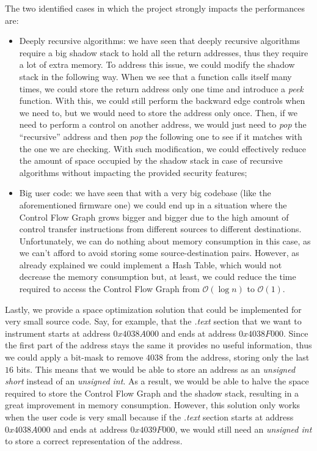 The two identified cases in which the project strongly impacts the performances
are:
\begin{itemize}
  \item Deeply recursive algorithms: we have seen that deeply recursive
    algorithms require a big shadow stack to hold all the return addresses, thus
    they require a lot of extra memory. To address this issue, we could modify the
    shadow stack in the following way. When we see that a function calls itself
    many times, we could store the return address only one time and introduce a \textit{peek}
    function. With this, we could still perform the backward edge controls when
    we need to, but we would need to store the address only once. Then, if we need
    to perform a control on another address, we would just need to \textit{pop} the
    ``recursive'' address and then \textit{pop} the following one to see if it
    matches with the one we are checking. With such modification, we could
    effectively reduce the amount of space occupied by the shadow stack in case
    of recursive algorithms without impacting the provided security features;

  \item Big user code: we have seen that with a very big codebase (like the aforementioned
    firmware one) we could end up in a situation where the Control Flow Graph
    grows bigger and bigger due to the high amount of control transfer
    instructions from different sources to different destinations. Unfortunately,
    we can do nothing about memory consumption in this case, as we can't afford to
    avoid storing some source-destination pairs. However, as already explained we
    could implement a Hash Table, which would not decrease the memory
    consumption but, at least, we could reduce the time required to access the
    Control Flow Graph from $\mathcal{O}(\log{n})$ to $\mathcal{O}(1)$.
\end{itemize}

Lastly, we provide a space optimization solution that could be implemented for very
small source code. Say, for example, that the \textit{.text} section that we want
to instrument starts at address $0x4038A0 00$ and ends at address $0x4038F000$.
Since the first part of the address stays the same it provides no useful
information, thus we could apply a bit-mask to remove $4038$ from the address,
storing only the last $16$ bits. This means that we would be able to store an address
as an \textit{unsigned short} instead of an \textit{unsigned int}. As a result, we
would be able to halve the space required to store the Control Flow Graph and the
shadow stack, resulting in a great improvement in memory consumption. However,
this solution only works when the user code is very small because if the \textit{.text}
section starts at address $0x4038A000$ and ends at address $0x4039F000$, we
would still need an \textit{unsigned int} to store a correct representation of the
address.

